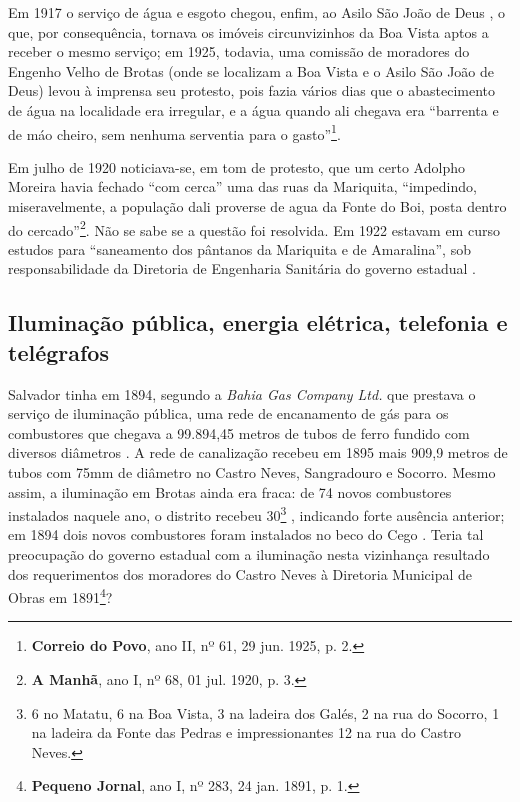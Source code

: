 Em 1917 o serviço de água e esgoto chegou, enfim, ao Asilo São João de Deus \cite[p.~63]{bahia_rpe_1914}, o que, por consequência, tornava os imóveis circunvizinhos da Boa Vista aptos a receber o mesmo serviço; em 1925, todavia, uma comissão de moradores do Engenho Velho de Brotas (onde se localizam a Boa Vista e o Asilo São João de Deus) levou à imprensa seu protesto, pois fazia vários dias que o abastecimento de água na localidade era irregular, e a água quando ali chegava era ``barrenta e de máo cheiro, sem nenhuma serventia para o gasto''\footnote{\textbf{Correio do Povo}, ano II, nº 61, 29 jun. 1925, p. 2.}.

Em julho de 1920 noticiava-se, em tom de protesto, que um certo Adolpho Moreira havia fechado ``com cerca'' uma das ruas da Mariquita, ``impedindo, miseravelmente, a população dali proverse de agua da Fonte do Boi, posta dentro do cercado''\footnote{\textbf{A Manhã}, ano I, nº 68, 01 jul. 1920, p. 3.}. Não se sabe se a questão foi resolvida. Em 1922 estavam em curso estudos para ``saneamento dos pântanos da Mariquita e de Amaralina'', sob responsabilidade da Diretoria de Engenharia Sanitária do governo estadual \cite[p.~409]{bahia_rpe_1922}.

\subsection{Iluminação pública, energia elétrica, telefonia e telégrafos}

Salvador tinha em 1894, segundo a \textit{Bahia Gas Company Ltd.} que prestava o serviço de iluminação pública, uma rede de encanamento de gás para os combustores que chegava a 99.894,45 metros de tubos de ferro fundido com diversos diâmetros \cite[p.~178]{salvador_relatorio_1894}. A rede de canalização recebeu em 1895 mais 909,9 metros de tubos com 75mm de diâmetro no Castro Neves, Sangradouro e Socorro. Mesmo assim, a iluminação em Brotas ainda era fraca: de 74 novos combustores instalados naquele ano, o distrito recebeu 30\footnote{6 no Matatu, 6 na Boa Vista, 3 na ladeira dos Galés, 2 na rua do Socorro, 1 na ladeira da Fonte das Pedras e impressionantes 12 na rua do Castro Neves.} \cite[pp.~149-150]{salvador_relatorio_1895}, indicando forte ausência anterior; em 1894 dois novos combustores foram instalados no beco do Cego \cite[p.~179]{salvador_relatorio_1894}. Teria tal preocupação do governo estadual com a iluminação nesta vizinhança resultado dos requerimentos dos moradores do Castro Neves à Diretoria Municipal de Obras em 1891\footnote{\textbf{Pequeno Jornal}, ano I, nº 283, 24 jan. 1891, p. 1.}? 

